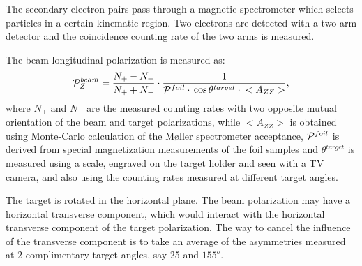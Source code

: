 {The secondary electron pairs pass through a magnetic spectrometer
which selects particles in a certain kinematic region. Two electrons
are detected with a two-arm detector and the 
coincidence counting rate of the two arms is measured.

The beam longitudinal polarization is measured as:
\begin{equation}
           {\cal P}^{beam}_{Z} = \frac{N_{+}-N_{-}}{N_{+}+N_{-}}\cdot{}
      \frac{1}{{\cal P}^{foil}\cdot{}\cos\theta{}^{target}\cdot{}<A_{ZZ}>},
\end{equation}
where $N_{+}$ and $N_{-}$ are the measured counting rates with two opposite
mutual orientation of the beam and target polarizations, while 
$<A_{ZZ}>$ is obtained using Monte-Carlo calculation of the M{\o}ller 
spectrometer acceptance, ${\cal P}^{foil}$ is derived from special
magnetization measurements of the foil samples and $\theta{}^{target}$
is measured using a scale, engraved on the target holder and seen
with a TV camera, and also using the counting rates measured at
different target angles.

The target is rotated in the
horizontal plane. The beam polarization may have a horizontal 
transverse component, which would interact with the horizontal transverse 
component of the target polarization. The way to cancel the influence
of the transverse component is to take an average of the asymmetries
measured at 2 complimentary target angles, say 25 and $155^o$. 
}


